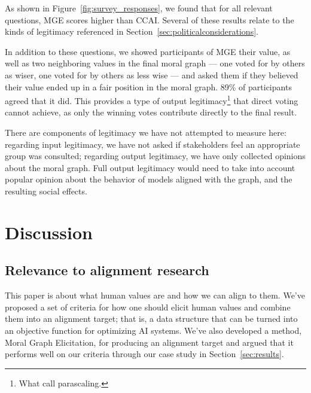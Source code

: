 \documentclass{article}
\theoremstyle{definition}
\begin{document}
As shown in Figure~\ref{fig:survey_responses}, we found that for all relevant questions, MGE scores higher than CCAI. Several of these results relate to the kinds of legitimacy referenced in Section~\ref{sec:politicalconsiderations}. 

In addition to these questions, we showed participants of MGE their value, as well as two neighboring values in the final moral graph  --- one voted for by others as wiser, one voted for by others as less wise --- and asked them if they believed their value ended up in a fair position in the moral graph. 89\% of participants agreed that it did. This provides a type of output legitimacy\footnote{ What \cite{Ovadya2023b} call parascaling.} that direct voting cannot achieve, as only the winning votes contribute directly to the final result.

There are components of legitimacy we have not attempted to measure here: regarding input legitimacy, we have not asked if stakeholders feel an appropriate group was consulted; regarding output legitimacy, we have only collected opinions about the moral graph. Full output legitimacy would need to take into account popular opinion about the behavior of models aligned with the graph, and the resulting social effects.


\section{Discussion}\label{sec:discussion}

\subsection{Relevance to alignment research}\label{sec:relevance}
This paper is about what human values are and how we can align to them. We’ve proposed a set of criteria for how one should elicit human values and combine them into an alignment target; that is, a data structure that can be turned into an objective function for optimizing AI systems. We’ve also developed a method, Moral Graph Elicitation, for producing an alignment target and argued that it performs well on our criteria through our case study in Section~\ref{sec:results}.
\end{document}

